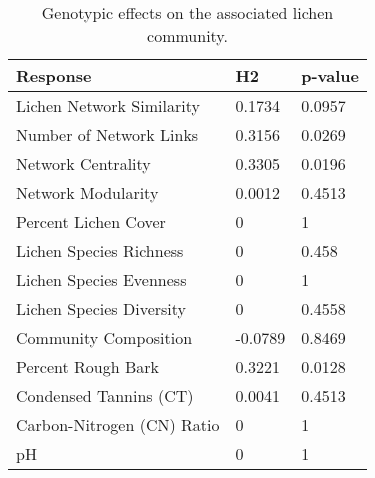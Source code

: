 \begin{table}[ht]
\centering
\begin{tabular}{lll}
  \hline
Response & H2 & p-value \\ 
  \hline
Lichen Network Similarity & 0.1734 & 0.0957 \\ 
  Number of Network Links & 0.3156 & 0.0269 \\ 
  Network Centrality & 0.3305 & 0.0196 \\ 
  Network Modularity & 0.0012 & 0.4513 \\ 
  Percent Lichen Cover & 0 & 1 \\ 
  Lichen Species Richness & 0 & 0.458 \\ 
  Lichen Species Evenness & 0 & 1 \\ 
  Lichen Species Diversity & 0 & 0.4558 \\ 
  Community Composition & -0.0789 & 0.8469 \\ 
  Percent Rough Bark & 0.3221 & 0.0128 \\ 
  Condensed Tannins (CT) & 0.0041 & 0.4513 \\ 
  Carbon-Nitrogen (CN) Ratio & 0 & 1 \\ 
  pH & 0 & 1 \\ 
   \hline
\end{tabular}
\caption{Genotypic effects on the associated lichen community.} 
\label{tab:h2_table}
\end{table}
